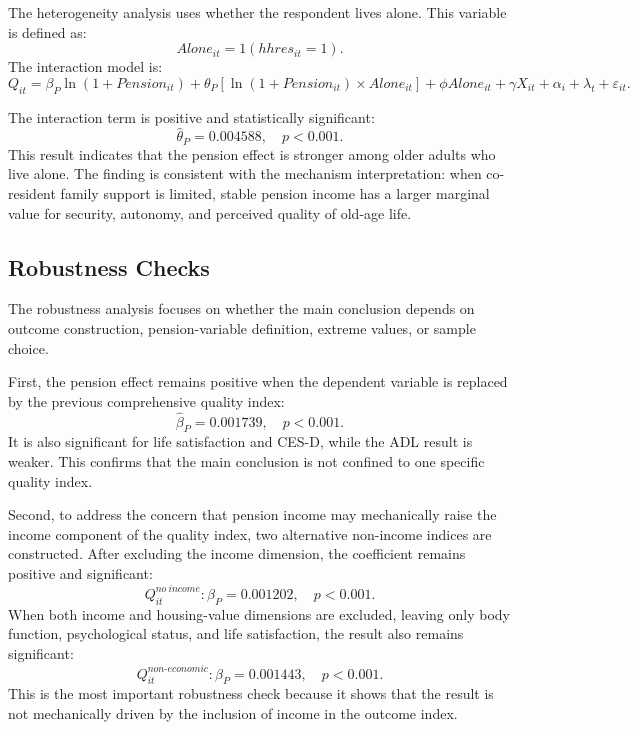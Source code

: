 The heterogeneity analysis uses whether the respondent lives alone. This variable is defined as:
\begin{equation}
Alone_{it}=1(hhres_{it}=1).
\end{equation}
The interaction model is:
\begin{equation}
Q_{it}=\beta_P \ln(1+Pension_{it})+\theta_P\left[\ln(1+Pension_{it})\times Alone_{it}\right]+\phi Alone_{it}+\gamma X_{it}+\alpha_i+\lambda_t+\varepsilon_{it}.
\end{equation}

The interaction term is positive and statistically significant:
\[
\widehat{\theta}_P=0.004588,\quad p<0.001.
\]
This result indicates that the pension effect is stronger among older adults who live alone. The finding is consistent with the mechanism interpretation: when co-resident family support is limited, stable pension income has a larger marginal value for security, autonomy, and perceived quality of old-age life.

\subsection{Robustness Checks}

The robustness analysis focuses on whether the main conclusion depends on outcome construction, pension-variable definition, extreme values, or sample choice.

First, the pension effect remains positive when the dependent variable is replaced by the previous comprehensive quality index:
\[
\widehat{\beta}_P=0.001739,\quad p<0.001.
\]
It is also significant for life satisfaction and CES-D, while the ADL result is weaker. This confirms that the main conclusion is not confined to one specific quality index.

Second, to address the concern that pension income may mechanically raise the income component of the quality index, two alternative non-income indices are constructed. After excluding the income dimension, the coefficient remains positive and significant:
\[
Q^{no\ income}_{it}: \widehat{\beta}_P=0.001202,\quad p<0.001.
\]
When both income and housing-value dimensions are excluded, leaving only body function, psychological status, and life satisfaction, the result also remains significant:
\[
Q^{non\text{-}economic}_{it}: \widehat{\beta}_P=0.001443,\quad p<0.001.
\]
This is the most important robustness check because it shows that the result is not mechanically driven by the inclusion of income in the outcome index.


